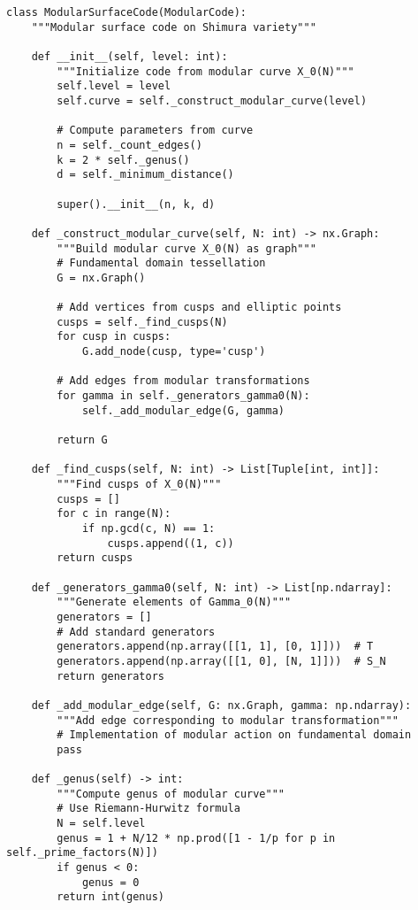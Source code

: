 \documentclass[12pt,a4paper]{article}
\begin{document}
\begin{lstlisting}[style=python,caption=Modular surface code on Shimura variety]
class ModularSurfaceCode(ModularCode):
    """Modular surface code on Shimura variety"""
    
    def __init__(self, level: int):
        """Initialize code from modular curve X_0(N)"""
        self.level = level
        self.curve = self._construct_modular_curve(level)
        
        # Compute parameters from curve
        n = self._count_edges()
        k = 2 * self._genus()
        d = self._minimum_distance()
        
        super().__init__(n, k, d)
    
    def _construct_modular_curve(self, N: int) -> nx.Graph:
        """Build modular curve X_0(N) as graph"""
        # Fundamental domain tessellation
        G = nx.Graph()
        
        # Add vertices from cusps and elliptic points
        cusps = self._find_cusps(N)
        for cusp in cusps:
            G.add_node(cusp, type='cusp')
        
        # Add edges from modular transformations
        for gamma in self._generators_gamma0(N):
            self._add_modular_edge(G, gamma)
        
        return G
    
    def _find_cusps(self, N: int) -> List[Tuple[int, int]]:
        """Find cusps of X_0(N)"""
        cusps = []
        for c in range(N):
            if np.gcd(c, N) == 1:
                cusps.append((1, c))
        return cusps
    
    def _generators_gamma0(self, N: int) -> List[np.ndarray]:
        """Generate elements of Gamma_0(N)"""
        generators = []
        # Add standard generators
        generators.append(np.array([[1, 1], [0, 1]]))  # T
        generators.append(np.array([[1, 0], [N, 1]]))  # S_N
        return generators
    
    def _add_modular_edge(self, G: nx.Graph, gamma: np.ndarray):
        """Add edge corresponding to modular transformation"""
        # Implementation of modular action on fundamental domain
        pass
    
    def _genus(self) -> int:
        """Compute genus of modular curve"""
        # Use Riemann-Hurwitz formula
        N = self.level
        genus = 1 + N/12 * np.prod([1 - 1/p for p in self._prime_factors(N)])
        if genus < 0:
            genus = 0
        return int(genus)
    

\end{lstlisting}
\end{document}

